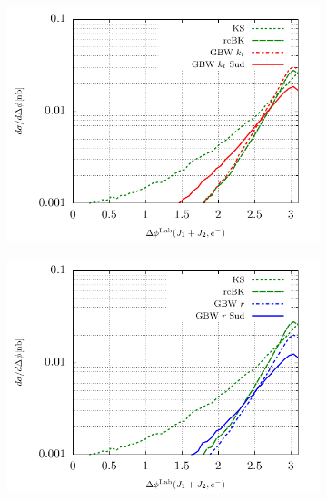 \documentclass[11pt]{article}
\numberwithin{equation}{section}
\numberwithin{table}{section}
\numberwithin{figure}{section}
\begin{document}
\begin{figure}[p]
	\begin{subfigure}{0.5\textwidth}
		\includegraphics[width=\textwidth]{plots/plotGBW2Lab}
	\end{subfigure}
	\begin{subfigure}{0.5\textwidth}
		\includegraphics[width=\textwidth]{plots/plotGBW3Lab}
	\end{subfigure}


\end{figure}
\end{document}
